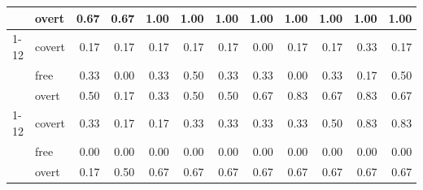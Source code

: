 \begin{tabular}{llrrrrrrrrrr}
	                       & overt                 & 0.67 & 0.67 & 1.00 & 1.00 & 1.00 & 1.00 & 1.00 & 1.00 & 1.00 & 1.00 \\
	\cline{1-12}
	\multirow[t]{3}{*}{C3} & covert                & 0.17 & 0.17 & 0.17 & 0.17 & 0.17 & 0.00 & 0.17 & 0.17 & 0.33 & 0.17 \\
	                       & free                  & 0.33 & 0.00 & 0.33 & 0.50 & 0.33 & 0.33 & 0.00 & 0.33 & 0.17 & 0.50 \\
	                       & overt                 & 0.50 & 0.17 & 0.33 & 0.50 & 0.50 & 0.67 & 0.83 & 0.67 & 0.83 & 0.67 \\
	\cline{1-12}
	\multirow[t]{3}{*}{C4} & covert                & 0.33 & 0.17 & 0.17 & 0.33 & 0.33 & 0.33 & 0.33 & 0.50 & 0.83 & 0.83 \\
	                       & free                  & 0.00 & 0.00 & 0.00 & 0.00 & 0.00 & 0.00 & 0.00 & 0.00 & 0.00 & 0.00 \\
	                       & overt                 & 0.17 & 0.50 & 0.67 & 0.67 & 0.67 & 0.67 & 0.67 & 0.67 & 0.67 & 0.67 \\
	\bottomrule
\end{tabular}
